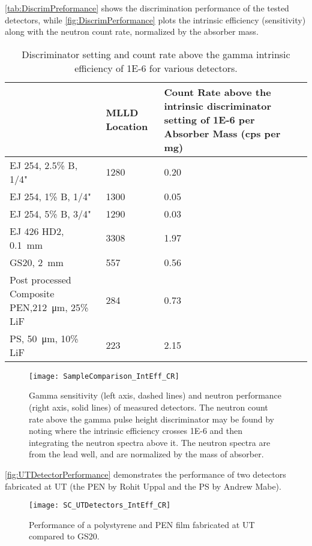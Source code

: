 \documentclass[onecolumn]{IEEEtran}
\begin{document}
\autoref{tab:DiscrimPreformance} shows the discrimination performance of the tested detectors, while \autoref{fig:DiscrimPerformance} plots the intrinsic efficiency (sensitivity) along with the neutron count rate, normalized by the absorber mass.
\begin{table}
  \centering
  \caption[Discrimination Performance]{Discriminator setting and count rate above the gamma intrinsic efficiency of \num{1E-6} for various detectors.}
  \label{tab:DiscrimPreformance}
  \begin{tabular}{m{5cm} | m{2cm} m{6cm}}
    \toprule
    &	MLLD Location	&	Count Rate above the intrinsic discriminator setting of \num{1E-6} per Absorber Mass (cps per mg)	\\
    \midrule
    EJ 254, 2.5\% B, 1/4"	&	1280	&	0.20	\\
    EJ 254, 1\% B, 1/4"	&	1300	&	0.05	\\
    EJ 254, 5\% B, 3/4"	&	1290		&	0.03	\\
    EJ 426 HD2, \SI{0.1}{\mm}&	3308		&	1.97	\\
    GS20, \SI{2}{\mm}	&	557		&	0.56	\\
    Post processed Composite PEN,\SI{212}{\um}, 25\% LiF	&	284	&	0.73	\\
    PS, \SI{50}{\um}, 10\% LiF & 223 & 2.15\\
    \bottomrule
\end{tabular}
\end{table}
\begin{figure}
  \centering
  \texttt{[image: SampleComparison\_IntEff\_CR]}
  \caption[Gamma Sensitivity and Neutron Response of Measured Detectors]{Gamma sensitivity (left axis, dashed lines) and neutron performance (right axis, solid lines) of measured detectors.  The neutron count rate above the gamma pulse height discriminator may be found by noting where the intrinsic efficiency crosses \num{1E-6} and then integrating the neutron spectra above it. The neutron spectra are from the lead well, and are normalized by the mass of absorber.}
  \label{fig:DiscrimPerformance}
\end{figure}
\autoref{fig:UTDetectorPerformance} demonstrates the performance of two detectors fabricated at UT (the PEN by Rohit Uppal and the PS by Andrew Mabe).
\begin{figure}
  \centering
  \texttt{[image: SC\_UTDetectors\_IntEff\_CR]}
  \caption[UT Fabricated Detector Performance]{Performance of a polystyrene and PEN film fabricated at UT compared to GS20.}
  \label{fig:UTDetectorPreformance}
\end{figure}
\end{document}
